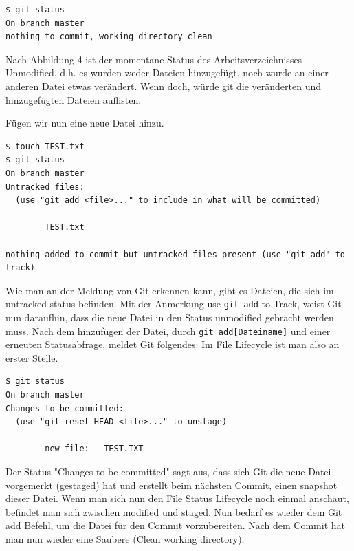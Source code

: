 \documentclass[12pt,a4paper,bibliography=totocnumbered,listof=totocnumbered]{scrartcl}
\begin{document}
\vspace{1em}
\begin{lstlisting}[caption=Git Statusbefehl nach git clone befehl, label=lst:arduino]
$ git status
On branch master
nothing to commit, working directory clean 
\end{lstlisting}

Nach Abbildung 4 ist der momentane Status des Arbeitsverzeichnisses Unmodified, d.h. 
es wurden weder Dateien hinzugefügt, noch wurde an einer anderen Datei etwas verändert. Wenn doch, würde git die veränderten und hinzugefügten Dateien auflisten.

Fügen wir nun eine neue Datei hinzu. 
\vspace{1em}
\begin{lstlisting}[caption=Git Statusbefehl nachdem erzeugen einer Datei, label=lst:arduino]
$ touch TEST.txt
$ git status
On branch master
Untracked files:
  (use "git add <file>..." to include in what will be committed)

        TEST.txt

nothing added to commit but untracked files present (use "git add" to track)

\end{lstlisting}

Wie man an der Meldung von Git erkennen kann, gibt es Dateien, die sich im untracked status befinden. Mit der Anmerkung use \lstinline|git add| to Track, weist Git nun daraufhin, dass die neue Datei in den Status unmodified gebracht werden muss. Nach dem hinzufügen der Datei, durch \lstinline|git add[Dateiname]| und einer erneuten Statusabfrage, meldet Git folgendes:
Im File Lifecycle ist man also an erster Stelle.
\newpage
\vspace{1em}
\begin{lstlisting}[caption=Git Statusbefehl nachdem erzeugen einer Datei, label=lst:arduino]
$ git status
On branch master
Changes to be committed:
  (use "git reset HEAD <file>..." to unstage)

        new file:   TEST.TXT

\end{lstlisting}
Der Status "Changes to be committed" sagt aus, dass sich Git die neue Datei vorgemerkt (gestaged) hat und erstellt beim nächsten Commit, einen snapshot dieser Datei. Wenn man sich nun den File Status Lifecycle noch einmal anschaut, befindet man sich zwischen modified und staged. Nun bedarf es wieder dem Git add Befehl, um die Datei für den Commit vorzubereiten. Nach dem Commit hat man nun wieder eine Saubere (Clean working directory). 
\end{document}
